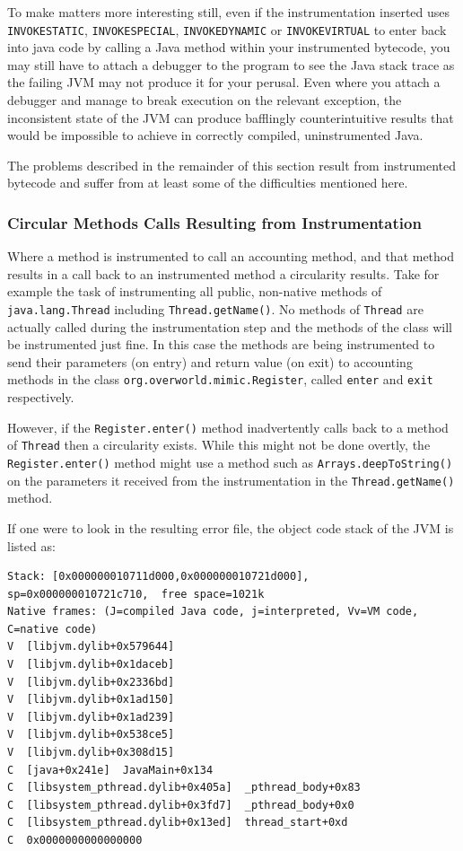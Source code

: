 \documentclass[]{final_report}
\begin{document}
To make matters more interesting still, even if the instrumentation inserted uses \lstinline{INVOKESTATIC}, \lstinline{INVOKESPECIAL}, \lstinline{INVOKEDYNAMIC} or \lstinline{INVOKEVIRTUAL} to enter back into java code by calling a Java method within your instrumented bytecode, you may still have to attach a debugger to the program to see the Java stack trace as the failing JVM may not produce it for your perusal. Even where you attach a debugger and manage to break execution on the relevant exception, the inconsistent state of the JVM can produce bafflingly counterintuitive results that would be impossible to achieve in correctly compiled, uninstrumented Java.

The problems described in the remainder of this section result from instrumented bytecode and suffer from at least some of the difficulties mentioned here.

\subsubsection{Circular Methods Calls Resulting from Instrumentation}

Where a method is instrumented to call an accounting method, and that method results in a call back to an instrumented method a circularity results. Take for example the task of instrumenting all public, non-native methods of \lstinline{java.lang.Thread} including \linebreak[4] \lstinline{Thread.getName()}. No methods of \lstinline{Thread} are actually called during the instrumentation step and the methods of the class will be instrumented just fine. In this case the methods are being instrumented to send their parameters (on entry) and return value (on exit) to accounting methods in the class \lstinline{org.overworld.mimic.Register}, called \lstinline{enter} and \lstinline{exit} \noop{} respectively.

However, if the \lstinline{Register.enter()} method inadvertently calls back to a method of \lstinline{Thread} then a circularity exists. While this might not be done overtly, the \lstinline{Register.enter()} method might use a method such as \lstinline{Arrays.deepToString()} on the parameters it received from the instrumentation in the \lstinline{Thread.getName()} method. 

If one were to look in the resulting error file, the object code stack of the JVM is listed as:

\begin{lstlisting}[caption=Stack Trace on Circular Method Call]
Stack: [0x000000010711d000,0x000000010721d000],  sp=0x000000010721c710,  free space=1021k
Native frames: (J=compiled Java code, j=interpreted, Vv=VM code, C=native code)
V  [libjvm.dylib+0x579644]
V  [libjvm.dylib+0x1daceb]
V  [libjvm.dylib+0x2336bd]
V  [libjvm.dylib+0x1ad150]
V  [libjvm.dylib+0x1ad239]
V  [libjvm.dylib+0x538ce5]
V  [libjvm.dylib+0x308d15]
C  [java+0x241e]  JavaMain+0x134
C  [libsystem_pthread.dylib+0x405a]  _pthread_body+0x83
C  [libsystem_pthread.dylib+0x3fd7]  _pthread_body+0x0
C  [libsystem_pthread.dylib+0x13ed]  thread_start+0xd
C  0x0000000000000000
\end{lstlisting}
\end{document}
